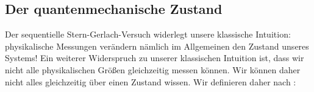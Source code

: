 \subsection{Der quantenmechanische Zustand}

Der sequentielle Stern-Gerlach-Versuch widerlegt unsere klassische Intuition: physikalische Messungen ver\"andern n\"amlich im Allgemeinen den Zustand unseres Systems! Ein weiterer Widerspruch zu unserer klassischen Intuition ist, dass wir nicht alle physikalischen Gr\"o\ss{}en gleichzeitig messen k\"onnen. Wir k\"onnen daher nicht alles gleichzeitig \"uber einen Zustand wissen. Wir definieren daher nach \textcite{Nolting}:
